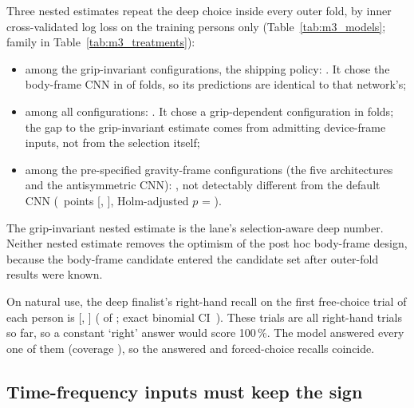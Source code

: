 Three nested estimates repeat the deep choice inside every outer fold, by inner cross-validated log loss on the training persons only (Table~\ref{tab:m3_models}; family  in Table~\ref{tab:m3_treatments}):
\begin{itemize}
  \item among the  grip-invariant configurations, the shipping policy: . It chose the body-frame CNN in  of  folds, so its predictions are identical to that network's;
  \item among all  configurations: . It chose a grip-dependent configuration in  folds; the gap to the grip-invariant estimate comes from admitting device-frame inputs, not from the selection itself;
  \item among the  pre-specified gravity-frame configurations (the five architectures and the antisymmetric CNN): , not detectably different from the default CNN (~points [, ], Holm-adjusted $p$ = ).
\end{itemize}
The grip-invariant nested estimate is the lane's selection-aware deep number.
Neither nested estimate removes the optimism of the post hoc body-frame design, because the body-frame candidate entered the candidate set after outer-fold results were known.

On natural use, the deep finalist's right-hand recall on the first free-choice trial of each person is  [, ] ( of ; exact binomial CI~\cite{clopper1934confidence}).
These trials are all right-hand trials so far, so a constant `right' answer would score 100\,\%.
The model answered every one of them (coverage ), so the answered and forced-choice recalls coincide.

\subsection{Time-frequency inputs must keep the sign}\label{app:m3:tfsign}

